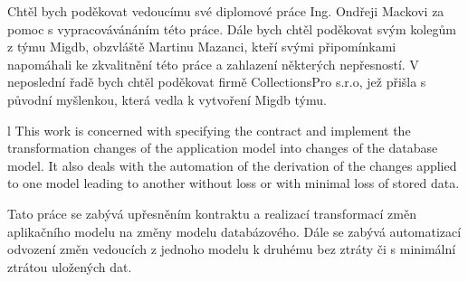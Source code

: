 \documentclass[11pt,twoside,a4paper]{book}
\begin{document}

\coverpagestarts


\acknowledgements
\noindent
Chtěl bych poděkovat vedoucímu své diplomové práce Ing. Ondřeji Mackovi za pomoc
s vypracovávánáním této práce. Dále bych chtěl poděkovat svým kolegům z týmu
Migdb, obzvláště Martinu Mazanci, kteří svými připomínkami napomáhali ke
zkvalitnění této práce a zahlazení některých nepřesností. V neposlední řadě
bych chtěl poděkovat firmě CollectionsPro s.r.o, jež přišla s původní
myšlenkou, která vedla k vytvoření Migdb týmu.





 l
\abstractpage
\noindent 
This work is concerned with specifying the contract and implement the transformation changes 
of the application model into changes of the database model. It also
deals with the automation of the derivation of the changes applied to one model
leading to another without loss or with minimal loss of stored data.


\baselineskip

\noindent
Tato práce se zabývá upřesněním kontraktu a realizací transformací změn
aplikačního modelu na změny modelu databázového. Dále se zabývá automatizací
odvození změn vedoucích z jednoho modelu k druhému bez ztráty či s minimální
ztrátou uložených dat.

\noindent


\tableofcontents



\listoffigures


\end{document}
